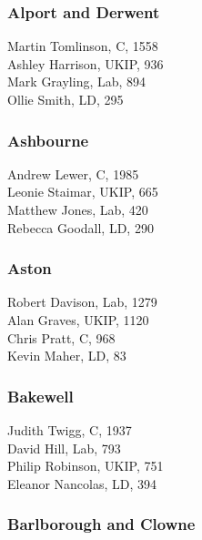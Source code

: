\documentclass[a4paper,openany,10pt]{book}
\begin{document}
\subsubsection*{Alport and Derwent}



Martin Tomlinson, C, 1558\\
Ashley Harrison, UKIP, 936\\
Mark Grayling, Lab, 894\\
Ollie Smith, LD, 295\\


\subsubsection*{Ashbourne}



Andrew Lewer, C, 1985\\
Leonie Staimar, UKIP, 665\\
Matthew Jones, Lab, 420\\
Rebecca Goodall, LD, 290\\


\subsubsection*{Aston}



Robert Davison, Lab, 1279\\
Alan Graves, UKIP, 1120\\
Chris Pratt, C, 968\\
Kevin Maher, LD, 83\\


\subsubsection*{Bakewell}



Judith Twigg, C, 1937\\
David Hill, Lab, 793\\
Philip Robinson, UKIP, 751\\
Eleanor Nancolas, LD, 394\\


\subsubsection*{Barlborough and Clowne}
\end{document}
